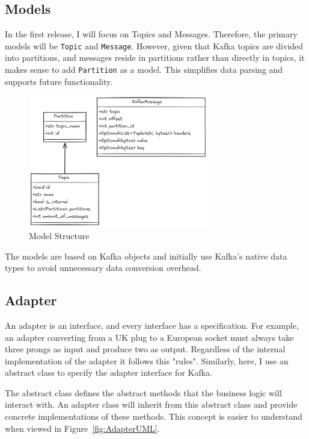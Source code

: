 \documentclass[10pt , a4paper]{report}
\begin{document}
\subsection{Models}

In the first release, I will focus on Topics and Messages. Therefore, the primary models will be \texttt{Topic} and \texttt{Message}. However, given that Kafka topics are divided into partitions, and messages reside in partitions rather than directly in topics, it makes sense to add \texttt{Partition} as a model. This simplifies data parsing and supports future functionality.

\begin{figure}[htbp]
  \begin{center}
    \includegraphics[width=0.7\textwidth]{imgs/Models.png}
  \end{center}
  \caption{Model Structure}\label{fig:models}
\end{figure}

The models are based on Kafka objects and initially use Kafka's native data types to avoid unnecessary data conversion overhead.

\newpage
\subsection{Adapter}\label{subsec:Adapter}

An adapter is an interface, and every interface has a specification. For example, an adapter converting from a UK plug to a European socket must always take three prongs as input and produce two as output. Regardless of the internal implementation of the adapter it follows this "rules". Similarly, here, I use an abstract class to specify the adapter interface for Kafka.

The abstract class defines the abstract methods that the business logic will interact with. An adapter class will inherit from this abstract class and provide concrete implementations of these methods. This concept is easier to understand when viewed in Figure~\ref{fig:AdapterUML}.
\end{document}
